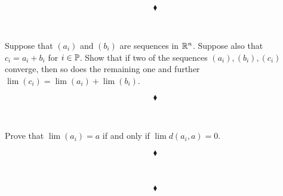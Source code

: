 $$\blacklozenge$$\\


\subsection{}
\begin{tcolorbox}
Suppose that $(a_i)$ and $(b_i)$ are sequences in $\mathbb{R}^n$. Suppose also that $c_i=a_i+b_i$ for $i\in\mathbb{P}$. Show that if two of the sequences
$(a_i), (b_i), (c_i)$ converge, then so does the remaining one and further $\lim (c_i) = \lim (a_i) + \lim (b_i)$.
\end{tcolorbox}

$$\blacklozenge$$\\


\subsection{}
\begin{tcolorbox}
Prove that $\lim (a_i) = a$ if and only if $\lim d(a_i,a)= 0$.
\end{tcolorbox}

$$\blacklozenge$$\\
\newpage
\renewcommand{\thesubsection}{\thesection.\arabic{subsection}}
\setcounter{subsection}{0}




\subsection{}
\begin{tcolorbox}

\end{tcolorbox}

$$\blacklozenge$$\\

\newpage


